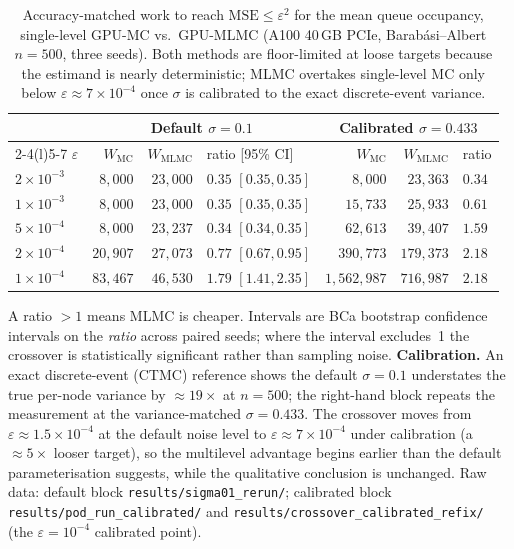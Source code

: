 \documentclass{ieeeaccess}
\begin{document}
\begin{table}[!t]
\caption{Accuracy-matched work to reach $\mathrm{MSE}\leq\varepsilon^2$ for the mean queue
occupancy, single-level GPU-MC vs.\ GPU-MLMC (A100 40\,GB PCIe, Barab\'{a}si--Albert $n{=}500$,
three seeds). Both methods are floor-limited at loose targets because the estimand is nearly
deterministic; MLMC overtakes single-level MC only below $\varepsilon\approx7\times10^{-4}$ once $\sigma$ is calibrated to the exact discrete-event variance.}
\label{tab:crossover}
\centering\small
\begin{tabular}{@{}l r r l r r l@{}}
\toprule
& \multicolumn{3}{c}{Default $\sigma{=}0.1$} & \multicolumn{3}{c}{Calibrated $\sigma{=}0.433$} \\
\cmidrule(r){2-4}\cmidrule(l){5-7}
$\varepsilon$ & $W_{\mathrm{MC}}$ & $W_{\mathrm{MLMC}}$ & ratio [95\% CI] & $W_{\mathrm{MC}}$ & $W_{\mathrm{MLMC}}$ & ratio \\
\midrule
$2\times10^{-3}$ & $8{,}000$   & $23{,}000$  & $0.35$ $[0.35,0.35]$ & $8{,}000$   & $23{,}363$  & $0.34$ \\
$1\times10^{-3}$ & $8{,}000$   & $23{,}000$  & $0.35$ $[0.35,0.35]$ & $15{,}733$  & $25{,}933$  & $0.61$ \\
$5\times10^{-4}$ & $8{,}000$   & $23{,}237$  & $0.34$ $[0.34,0.35]$ & $62{,}613$  & $39{,}407$  & $\mathbf{1.59}$ \\
$2\times10^{-4}$ & $20{,}907$  & $27{,}073$  & $0.77$ $[0.67,0.95]$ & $390{,}773$ & $179{,}373$ & $\mathbf{2.18}$ \\
$1\times10^{-4}$ & $83{,}467$  & $46{,}530$  & $\mathbf{1.79}$ $[1.41,2.35]$ & $1{,}562{,}987$ & $716{,}987$ & $\mathbf{2.18}$ \\
\bottomrule
\end{tabular}
\vspace{2pt}
\parbox{\textwidth}{\footnotesize A ratio $>1$ means MLMC is cheaper. Intervals are BCa bootstrap confidence
intervals on the \emph{ratio} across paired seeds; where the interval excludes~1 the crossover is
statistically significant rather than sampling noise. \textbf{Calibration.} An exact
discrete-event (CTMC) reference shows the default $\sigma{=}0.1$ understates the true
per-node variance by ${\approx}19\times$ at $n{=}500$; the right-hand block repeats the
measurement at the variance-matched $\sigma{=}0.433$. The crossover moves from
$\varepsilon\approx1.5\times10^{-4}$ at the default noise level to $\varepsilon\approx7\times10^{-4}$
under calibration (a ${\approx}5\times$ looser target), so the multilevel advantage begins earlier
than the default parameterisation suggests, while the qualitative conclusion is unchanged. Raw data:
default block \texttt{results/sigma01\_rerun/}; calibrated block
\texttt{results/pod\_run\_calibrated/} and \texttt{results/crossover\_calibrated\_refix/} (the
$\varepsilon{=}10^{-4}$ calibrated point).}
\end{table}
\end{document}
